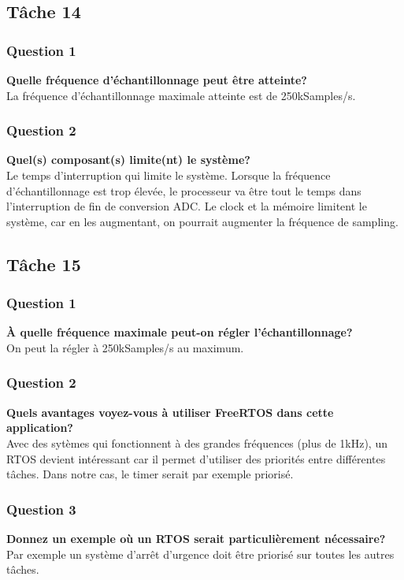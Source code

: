 \documentclass[12pt]{article}
\begin{document}
	\subsection{Tâche 14}
	\subsubsection{Question 1}
	\textbf{Quelle fréquence d’échantillonnage peut être atteinte?}\\
	La fréquence d'échantillonnage maximale atteinte est de 250kSamples/s.
	\subsubsection{Question 2}
	\textbf{Quel(s) composant(s) limite(nt) le système?}\\
	Le temps d'interruption qui limite le système. Lorsque la fréquence d'échantillonnage est trop élevée, le processeur va être tout le temps dans l'interruption de fin de conversion ADC. Le clock et la mémoire limitent le système, car en les augmentant, on pourrait augmenter la fréquence de sampling.
	
	\subsection{Tâche 15}
	\subsubsection{Question 1}
	\textbf{À quelle fréquence maximale peut-on régler l’échantillonnage?}\\
	On peut la régler à 250kSamples/s au maximum.
	\subsubsection{Question 2}
	\textbf{Quels avantages voyez-vous à utiliser FreeRTOS dans cette application?}\\
	Avec des sytèmes qui fonctionnent à des grandes fréquences (plus de 1kHz), un RTOS devient intéressant car il permet d'utiliser des priorités entre différentes tâches. Dans notre cas, le timer serait par exemple priorisé.
	\subsubsection{Question 3}
	\textbf{Donnez un exemple où un RTOS serait particulièrement nécessaire?}\\
	Par exemple un système d'arrêt d'urgence doit être priorisé sur toutes les autres tâches.
\end{document}
